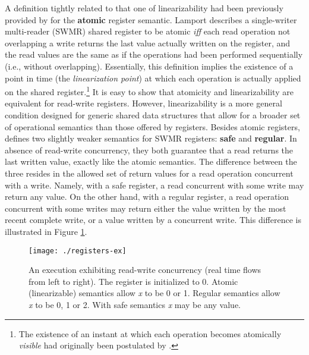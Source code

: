 \documentclass[letter, 11pt]{article}
\newcommand{\citeN}{\citet}
\begin{document}
A definition tightly related to that one of linearizability had been previously 
provided by \citeN{Lamport:86:vol2} for the \textbf{atomic} register semantic.
Lamport describes a single-writer multi-reader (SWMR) shared register to be atomic 
\emph{iff} each read operation not overlapping 
a write returns the last value actually written on the register, 
and the read values are the same as if the operations had been performed sequentially (i.e., without overlapping). Essentially, this definition implies the existence of a point in time 
(the \emph{linearization point}) at which each operation is actually applied on the shared register.\footnote{The existence of an instant 
at which each operation becomes atomically \emph{visible} had originally been postulated by \citeN{Lamport:83}.}
It is easy to show that 
atomicity and linearizability are equivalent for read-write registers.
However, linearizability is a more general condition designed 
for generic shared data structures that allow for a broader set of operational semantics 
than those offered by registers.
Besides atomic registers, \citeN{Lamport:86:vol2} defines  two slightly weaker semantics for SWMR registers: \textbf{safe} and \textbf{regular}.
In absence of read-write concurrency, they both guarantee that a read returns the last written value, 
exactly like the atomic semantics. The difference between the three resides in the allowed set of return values for a read operation 
concurrent with a write.
Namely, with a safe register, a read concurrent with some write may return any value. 
On the other hand, with a regular register, a read operation concurrent with some writes 
may return either the value written by the most recent complete write, 
or a value written by a concurrent write.
This difference is illustrated in Figure \ref{fig:reg-ex}.
\begin{figure}[h]
	\centering
	\texttt{[image: ./registers-ex]} 	\caption{An execution exhibiting read-write concurrency (real time flows from left to right). The register is initialized to 0.  
	Atomic (linearizable) semantics allow \emph{x} to be 0 or 1. 
	Regular semantics allow \emph{x} to be 0, 1 or 2. With safe semantics \emph{x} may be any value.}
	\label{fig:reg-ex}
\end{figure}
\end{document}
